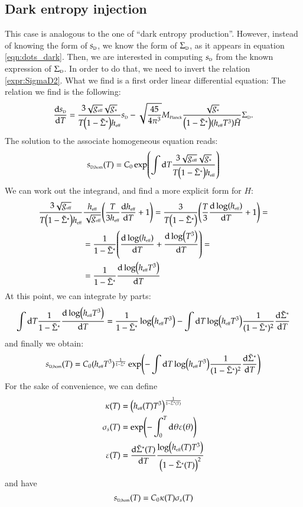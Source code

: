 \subsection{Dark entropy injection}
This case is analogous to the one of ``dark entropy production''. However,
instead of knowing the form of $\sD$, we know the form of $\SigmaD$, as it
appears in equation \eqref{eqn:dots_dark}. Then, we are interested in computing
$\sD$ from the known expression of $\SigmaD$.
In order to do that, we need to invert the relation \eqref{expr:SigmaD2}.
What we find is a first order linear differential equation:
The relation we find is the following:
\begin{align}
 \dv{\sD}{T} = \frac{3 \sqrt{\geff}\sqrt{g_\ast}}{T\qty(1 - \Sigmatstar)\heff }\sD - \sqrt{\frac{45}{4 \pi^3}}\Mpl \frac{\sqrt{g_\ast}}{\qty(1 - \Sigmatstar)\qty(\heff T^3) \tilde H}\SigmaD.
\end{align}
The solution to the associate homogeneous equation reads:
\begin{align}
 \homosD(T)= C_0 \exp(\int \dd T \frac{3 \sqrt{\geff}\sqrt{g_\ast}}{T\qty(1 - \Sigmatstar)\heff } )
\end{align}
We can work out the integrand, and find a more explicit form for $H$:
\begin{align}
 \frac{3 \sqrt{\geff}}{T\qty(1 - \Sigmatstar)\heff }&\frac{\heff}{\sqrt{\geff}} \qty(\frac{T}{3\heff}\dv{\heff}{T} +1)
  = \frac{3}{T\qty(1 - \Sigmatstar)}\qty(\frac{T}{3} \dv{\log(\heff)}{T} + 1)=\\
  &=\frac{1}{1 - \Sigmatstar}\qty(\dv{\log(\heff)}{T} + \dv{\log(T^3)}{T})=\\
  &=\frac{1}{1 - \Sigmatstar}\dv{\log(\heff T^3)}{T}
\end{align}
At this point, we can integrate by parts:
\begin{align}
 \int\dd T \frac{1}{1 - \Sigmatstar}\dv{\log(\heff T^3)}{T} = \frac{1}{1 - \Sigmatstar}\log(\heff T^3) -
 \int \dd T \log(\heff T^3)\frac{1}{(1-\Sigmatstar)^2}\dv{\Sigmatstar}{T}
\end{align}
and finally we obtain:
\begin{align}
 \homosD(T)= C_0 (\heff T^3)^\frac{1}{1 - \Sigmatstar}\exp(-\int \dd T \log(\heff T^3)\frac{1}{(1-\Sigmatstar)^2}\dv{\Sigmatstar}{T})
\end{align}
For the sake of convenience, we can define
\begin{align}
 \kappa(T) &= \qty(\heff(T) T^3)^\frac{1}{1 - \Sigmatstar(T)}\\
 \sigma_s(T) &= \exp(- \int_0^T \dd\theta \varepsilon(\theta)) \\
 \varepsilon(T) &= \dv{\Sigmatstar(T)}{T} \frac{\log(\heff(T) T^3)}{\qty(1 - \Sigmatstar(T))^2}
\end{align}
and have
\begin{align}
 \homosD(T)= C_0\kappa(T)\sigma_s(T)
\end{align}

